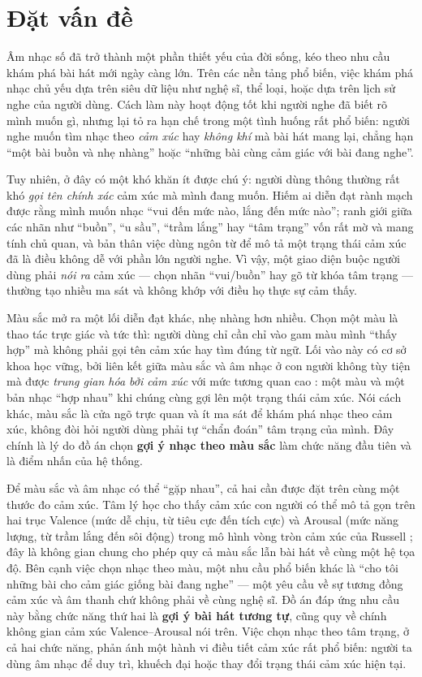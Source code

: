 \documentclass[../DoAn.tex]{subfiles}
\begin{document}
\section{Đặt vấn đề}
\label{section:1.1}
Âm nhạc số đã trở thành một phần thiết yếu của đời sống, kéo theo nhu cầu khám phá bài hát mới ngày càng lớn. Trên các nền tảng phổ biến, việc khám phá nhạc chủ yếu dựa trên siêu dữ liệu như nghệ sĩ, thể loại, hoặc dựa trên lịch sử nghe của người dùng. Cách làm này hoạt động tốt khi người nghe đã biết rõ mình muốn gì, nhưng lại tỏ ra hạn chế trong một tình huống rất phổ biến: người nghe muốn tìm nhạc theo \textit{cảm xúc} hay \textit{không khí} mà bài hát mang lại, chẳng hạn ``một bài buồn và nhẹ nhàng'' hoặc ``những bài cùng cảm giác với bài đang nghe''.

Tuy nhiên, ở đây có một khó khăn ít được chú ý: người dùng thông thường rất khó \textit{gọi tên chính xác} cảm xúc mà mình đang muốn. Hiếm ai diễn đạt rành mạch được rằng mình muốn nhạc ``vui đến mức nào, lắng đến mức nào''; ranh giới giữa các nhãn như ``buồn'', ``u sầu'', ``trầm lắng'' hay ``tâm trạng'' vốn rất mờ và mang tính chủ quan, và bản thân việc dùng ngôn từ để mô tả một trạng thái cảm xúc đã là điều không dễ với phần lớn người nghe. Vì vậy, một giao diện buộc người dùng phải \textit{nói ra} cảm xúc --- chọn nhãn ``vui/buồn'' hay gõ từ khóa tâm trạng --- thường tạo nhiều ma sát và không khớp với điều họ thực sự cảm thấy.

Màu sắc mở ra một lối diễn đạt khác, nhẹ nhàng hơn nhiều. Chọn một màu là thao tác trực giác và tức thì: người dùng chỉ cần chỉ vào gam màu mình ``thấy hợp'' mà không phải gọi tên cảm xúc hay tìm đúng từ ngữ. Lối vào này có cơ sở khoa học vững, bởi liên kết giữa màu sắc và âm nhạc ở con người không tùy tiện mà được \textit{trung gian hóa bởi cảm xúc} với mức tương quan cao \cite{palmer2013music}: một màu và một bản nhạc ``hợp nhau'' khi chúng cùng gợi lên một trạng thái cảm xúc. Nói cách khác, màu sắc là cửa ngõ trực quan và ít ma sát để khám phá nhạc theo cảm xúc, không đòi hỏi người dùng phải tự ``chẩn đoán'' tâm trạng của mình. Đây chính là lý do đồ án chọn \textbf{gợi ý nhạc theo màu sắc} làm chức năng đầu tiên và là điểm nhấn của hệ thống.

Để màu sắc và âm nhạc có thể ``gặp nhau'', cả hai cần được đặt trên cùng một thước đo cảm xúc. Tâm lý học cho thấy cảm xúc con người có thể mô tả gọn trên hai trục Valence (mức dễ chịu, từ tiêu cực đến tích cực) và Arousal (mức năng lượng, từ trầm lắng đến sôi động) trong mô hình vòng tròn cảm xúc của Russell \cite{russell1980circumplex}; đây là không gian chung cho phép quy cả màu sắc lẫn bài hát về cùng một hệ tọa độ. Bên cạnh việc chọn nhạc theo màu, một nhu cầu phổ biến khác là ``cho tôi những bài cho cảm giác giống bài đang nghe'' --- một yêu cầu về sự tương đồng cảm xúc và âm thanh chứ không phải về cùng nghệ sĩ. Đồ án đáp ứng nhu cầu này bằng chức năng thứ hai là \textbf{gợi ý bài hát tương tự}, cũng quy về chính không gian cảm xúc Valence--Arousal nói trên. Việc chọn nhạc theo tâm trạng, ở cả hai chức năng, phản ánh một hành vi điều tiết cảm xúc rất phổ biến: người ta dùng âm nhạc để duy trì, khuếch đại hoặc thay đổi trạng thái cảm xúc hiện tại.
\end{document}
